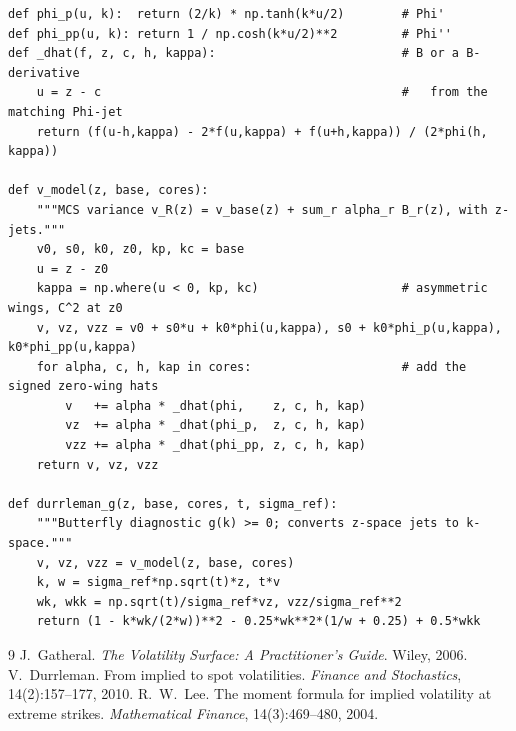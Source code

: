 \documentclass[11pt]{article}
\begin{document}
\begin{lstlisting}[caption={The full model $v_R(z)$ and Durrleman $g(k)$
(distilled from \texttt{models/sigmoid/\{kernels,sigmoid\}.py}).}]
def phi_p(u, k):  return (2/k) * np.tanh(k*u/2)        # Phi'
def phi_pp(u, k): return 1 / np.cosh(k*u/2)**2         # Phi''
def _dhat(f, z, c, h, kappa):                          # B or a B-derivative
    u = z - c                                          #   from the matching Phi-jet
    return (f(u-h,kappa) - 2*f(u,kappa) + f(u+h,kappa)) / (2*phi(h, kappa))

def v_model(z, base, cores):
    """MCS variance v_R(z) = v_base(z) + sum_r alpha_r B_r(z), with z-jets."""
    v0, s0, k0, z0, kp, kc = base
    u = z - z0
    kappa = np.where(u < 0, kp, kc)                    # asymmetric wings, C^2 at z0
    v, vz, vzz = v0 + s0*u + k0*phi(u,kappa), s0 + k0*phi_p(u,kappa), k0*phi_pp(u,kappa)
    for alpha, c, h, kap in cores:                     # add the signed zero-wing hats
        v   += alpha * _dhat(phi,    z, c, h, kap)
        vz  += alpha * _dhat(phi_p,  z, c, h, kap)
        vzz += alpha * _dhat(phi_pp, z, c, h, kap)
    return v, vz, vzz

def durrleman_g(z, base, cores, t, sigma_ref):
    """Butterfly diagnostic g(k) >= 0; converts z-space jets to k-space."""
    v, vz, vzz = v_model(z, base, cores)
    k, w = sigma_ref*np.sqrt(t)*z, t*v
    wk, wkk = np.sqrt(t)/sigma_ref*vz, vzz/sigma_ref**2
    return (1 - k*wk/(2*w))**2 - 0.25*wk**2*(1/w + 0.25) + 0.5*wkk
\end{lstlisting}

\begin{thebibliography}{9}
 J.~Gatheral. \emph{The Volatility Surface: A Practitioner's
Guide}. Wiley, 2006.
 V.~Durrleman. From implied to spot volatilities.
\emph{Finance and Stochastics}, 14(2):157--177, 2010.
 R.~W.~Lee. The moment formula for implied volatility at extreme
strikes. \emph{Mathematical Finance}, 14(3):469--480, 2004.
\end{thebibliography}
\end{document}
